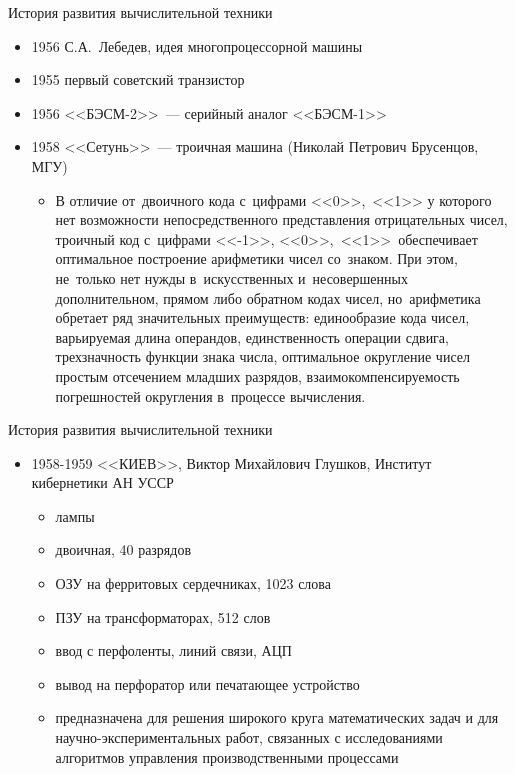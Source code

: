 \documentclass[aspectratio=169,14pt]{beamer}
\begin{document}
\begin{frame}{История развития вычислительной техники}
    \begin{itemize}
        \item 1956 С.А.~Лебедев, идея многопроцессорной машины
        \item 1955 первый советский транзистор
        \item 1956 <<БЭСМ-2>>~--- серийный аналог <<БЭСМ-1>>
        \item 1958 <<Сетунь>>~--- троичная машина (Николай Петрович Брусенцов, МГУ)
        \begin{itemize}
            \item \begin{scriptsize}\begin{spacing}{1.2}В отличие от двоичного кода с цифрами <<0>>, <<1>> у которого нет
            возможности непосредственного представления отрицательных чисел, троичный
            код с цифрами <<-1>>, <<0>>, <<1>> обеспечивает оптимальное построение
            арифметики чисел со знаком. При этом, не только нет нужды в искусственных
            и несовершенных дополнительном, прямом либо обратном кодах чисел,
            но арифметика обретает ряд значительных преимуществ: единообразие кода чисел,
            варьируемая длина операндов, единственность операции сдвига, трехзначность
            функции знака числа, оптимальное округление чисел простым отсечением младших
            разрядов, взаимокомпенсируемость погрешностей округления в процессе вычисления.
            \end{spacing}
            \end{scriptsize}
        \end{itemize}
    \end{itemize}
\end{frame}

\begin{frame}{История развития вычислительной техники}
    \begin{itemize}
        \item 1958-1959 <<КИЕВ>>, Виктор Михайлович Глушков, Институт кибернетики АН УССР
        \begin{itemize}
            \item лампы
            \item двоичная, 40 разрядов
            \item ОЗУ на ферритовых сердечниках, 1023 слова
            \item ПЗУ на трансформаторах, 512 слов
            \item ввод с перфоленты, линий связи, АЦП
            \item вывод на перфоратор или печатающее устройство
            \item предназначена для решения широкого круга математических задач и
            для научно-экспериментальных работ, связанных с исследованиями алгоритмов
            управления производственными процессами
        \end{itemize}
    \end{itemize}
\end{frame}
\end{document}

